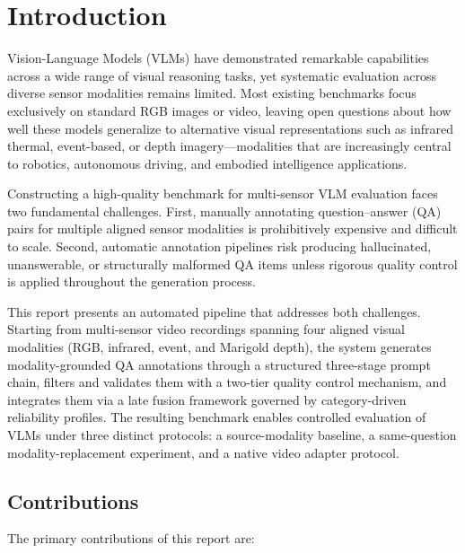 
\chapter{Introduction}
\label{ch:introduction}

Vision-Language Models (VLMs) have demonstrated remarkable capabilities across
a wide range of visual reasoning tasks, yet systematic evaluation across diverse
sensor modalities remains limited. Most existing benchmarks focus exclusively on
standard RGB images or video, leaving open questions about how well these models
generalize to alternative visual representations such as infrared thermal,
event-based, or depth imagery—modalities that are increasingly central to
robotics, autonomous driving, and embodied intelligence applications.

Constructing a high-quality benchmark for multi-sensor VLM evaluation faces two
fundamental challenges. First, manually annotating question--answer (QA) pairs
for multiple aligned sensor modalities is prohibitively expensive and difficult
to scale. Second, automatic annotation pipelines risk producing hallucinated,
unanswerable, or structurally malformed QA items unless rigorous quality control
is applied throughout the generation process.

This report presents an automated pipeline that addresses both challenges.
Starting from multi-sensor video recordings spanning four aligned visual modalities
(RGB, infrared, event, and Marigold depth), the system generates modality-grounded
QA annotations through a structured three-stage prompt chain, filters and validates them with a two-tier quality control mechanism,
and integrates them via a late fusion framework governed by category-driven
reliability profiles.
The resulting benchmark enables controlled evaluation of VLMs under three
distinct protocols: a source-modality baseline, a same-question
modality-replacement experiment, and a native video adapter protocol.

\section{Contributions}
\label{sec:intro_contributions}

The primary contributions of this report are:

